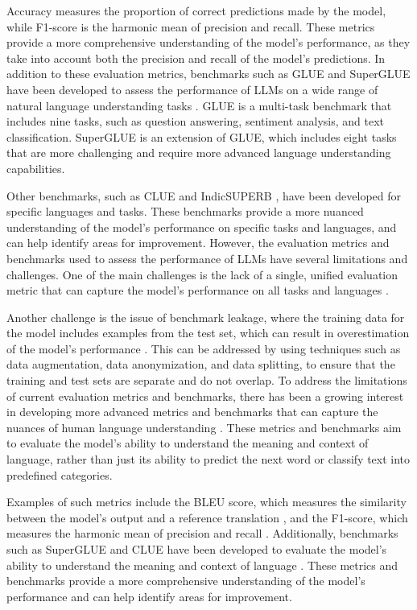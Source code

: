 \documentclass[11pt]{article}
\begin{document}
Accuracy measures the proportion of correct predictions made by the model, while F1-score is the harmonic mean of precision and recall. These metrics provide a more comprehensive understanding of the model's performance, as they take into account both the precision and recall of the model's predictions. In addition to these evaluation metrics, benchmarks such as GLUE and SuperGLUE have been developed to assess the performance of LLMs on a wide range of natural language understanding tasks \cite{ref91}. GLUE is a multi-task benchmark that includes nine tasks, such as question answering, sentiment analysis, and text classification. SuperGLUE is an extension of GLUE, which includes eight tasks that are more challenging and require more advanced language understanding capabilities.

Other benchmarks, such as CLUE \cite{ref92} and IndicSUPERB \cite{ref93}, have been developed for specific languages and tasks. These benchmarks provide a more nuanced understanding of the model's performance on specific tasks and languages, and can help identify areas for improvement. However, the evaluation metrics and benchmarks used to assess the performance of LLMs have several limitations and challenges. One of the main challenges is the lack of a single, unified evaluation metric that can capture the model's performance on all tasks and languages \cite{ref94}.

Another challenge is the issue of benchmark leakage, where the training data for the model includes examples from the test set, which can result in overestimation of the model's performance \cite{ref95}. This can be addressed by using techniques such as data augmentation, data anonymization, and data splitting, to ensure that the training and test sets are separate and do not overlap. To address the limitations of current evaluation metrics and benchmarks, there has been a growing interest in developing more advanced metrics and benchmarks that can capture the nuances of human language understanding \cite{ref96}. These metrics and benchmarks aim to evaluate the model's ability to understand the meaning and context of language, rather than just its ability to predict the next word or classify text into predefined categories.

Examples of such metrics include the BLEU score, which measures the similarity between the model's output and a reference translation \cite{ref97}, and the F1-score, which measures the harmonic mean of precision and recall \cite{ref90}. Additionally, benchmarks such as SuperGLUE and CLUE have been developed to evaluate the model's ability to understand the meaning and context of language \cite{ref91}. These metrics and benchmarks provide a more comprehensive understanding of the model's performance and can help identify areas for improvement.
\end{document}

